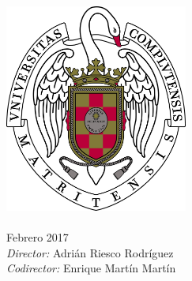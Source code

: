 \documentclass[
11pt, %
english, %
singlespacing, %
headsepline, %
]{MastersDoctoralThesis} %
\author{Mayra Alexandra Castrosqui Florián} %
\begin{document}
\frontmatter %

\pagestyle{plain} %


\begin{titlepage}
\begin{center}

\HRule \\[0.4cm] %
{\huge \bfseries \ttitle\par}\vspace{0.4cm} %
\HRule \\[1.5cm] %

\LARGE \authorname \\[0.5cm]
\textsc{\Large \degreename}\\ %
\textsc{\Large \facname}\\ %
\textsc{\Large \univname}\\[1.5cm] %

\includegraphics[width=6cm]{Figures/UCM} \\[1.5cm] %


\textsc{\LARGE \subjectname}\\ %
\Large Febrero 2017 \\[1.5cm] 

\large \emph{Director:} Adrián Riesco Rodríguez \\
\large \emph{Codirector:} Enrique Martín Martín \\
 
\vfill
\end{center}
\end{titlepage}
\end{document}

